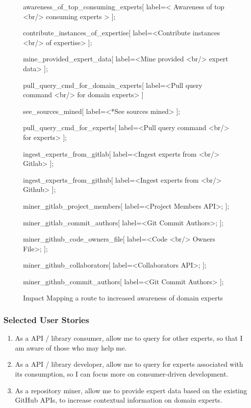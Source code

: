 \begin{figure}[h!]
{		awareness_of_top_consuming_experts[
			label=< Awareness of top <br/> consuming experts >
		];
		
		contribute_instances_of_expertise[
			label=<Contribute instances <br/> of expertise>
		];
		
		mine_provided_expert_data[
			label=<Mine provided <br/> expert data>
		];
		
		
		pull_query_cmd_for_domain_experts[
			label=<Pull query command <br/> for domain experts>
		]
		
		see_sources_mined[
			label=<*See sources mined>
		]; 
		
		pull_query_cmd_for_experts[
			label=<Pull query command <br/> for experts>
		];
		
		ingest_experts_from_gitlab[
			label=<Ingest experts from <br/> Gitlab>
		];
		
		ingest_experts_from_github[
			label=<Ingest experts from <br/> Github>
		];
		
		miner_gitlab_project_members[
			label=<Project Members API>;
		];
		
		miner_gitlab_commit_authors[
			label=<Git Commit Authors>;
		];
		
		miner_github_code_owners_file[
			label=<Code <br/> Owners File>;
		];
		
		miner_github_collaborators[
			label=<Collaborators API>;
		];
		
		miner_github_commit_authors[
			label=<Git Commit Authors>
		];
		
	}
	\label{fig:expertsImpactMap}
	\caption{Impact Mapping a route to increased awareness of domain experts}
\end{figure}

\subsubsection{Selected User Stories}

\begin{enumerate}
	\item As a API / library consumer, allow me to query for other experts, so that I am aware of those who may help me.
	
	\item As a API / library developer, allow me to query for experts associated with its consumption, so I can focus more on consumer-driven development.
	
	\item As a repository miner, allow me to provide expert data based on the existing GitHub APIs, to increase contextual information on domain experts.
	
\end{enumerate}

